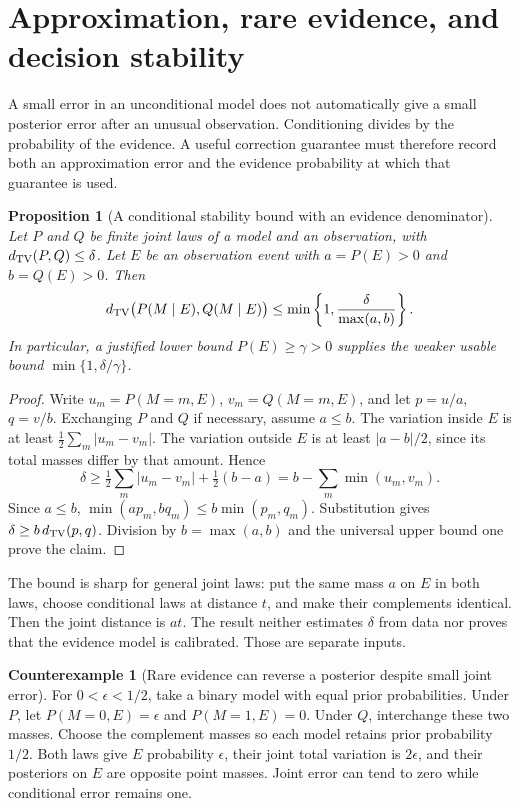 \documentclass[11pt,letterpaper]{article}
\theoremstyle{plain}
\newtheorem{proposition}[theorem]{Proposition}
\theoremstyle{definition}
\newtheorem{counterexample}[theorem]{Counterexample}
\begin{document}
\section{Approximation, rare evidence, and decision stability}\label{sec:posterior-errors}
A small error in an unconditional model does not automatically give a small posterior error after an unusual observation. Conditioning divides by the probability of the evidence. A useful correction guarantee must therefore record both an approximation error and the evidence probability at which that guarantee is used.

\begin{proposition}[A conditional stability bound with an evidence denominator]\label{prop:conditioning}
Let $P$ and $Q$ be finite joint laws of a model and an observation, with $d_{\mathrm{TV}}(P,Q)\leq\delta$. Let $E$ be an observation event with $a=P(E)>0$ and $b=Q(E)>0$. Then
\begin{equation}\label{eq:conditional-bound}
d_{\mathrm{TV}}\bigl(P(M\mid E),Q(M\mid E)\bigr)
\leq\min\left\{1,\frac{\delta}{\max(a,b)}\right\}.
\end{equation}
In particular, a justified lower bound $P(E)\geq\gamma>0$ supplies the weaker usable bound $\min\{1,\delta/\gamma\}$.
\end{proposition}
\begin{proof}
Write $u_m=P(M=m,E)$, $v_m=Q(M=m,E)$, and let $p=u/a$, $q=v/b$. Exchanging $P$ and $Q$ if necessary, assume $a\leq b$. The variation inside $E$ is at least $\tfrac12\sum_m|u_m-v_m|$. The variation outside $E$ is at least $|a-b|/2$, since its total masses differ by that amount. Hence
\[
\delta\geq \tfrac12\sum_m|u_m-v_m|+\tfrac12(b-a)
=b-\sum_m\min(u_m,v_m).
\]
Since $a\leq b$, $\min(ap_m,bq_m)\leq b\min(p_m,q_m)$. Substitution gives $\delta\geq b\,d_{\mathrm{TV}}(p,q)$. Division by $b=\max(a,b)$ and the universal upper bound one prove the claim.
\end{proof}

The bound is sharp for general joint laws: put the same mass $a$ on $E$ in both laws, choose conditional laws at distance $t$, and make their complements identical. Then the joint distance is $at$. The result neither estimates $\delta$ from data nor proves that the evidence model is calibrated. Those are separate inputs.

\begin{counterexample}[Rare evidence can reverse a posterior despite small joint error]\label{ex:rare-evidence}
For $0<\epsilon<1/2$, take a binary model with equal prior probabilities. Under $P$, let $P(M=0,E)=\epsilon$ and $P(M=1,E)=0$. Under $Q$, interchange these two masses. Choose the complement masses so each model retains prior probability $1/2$. Both laws give $E$ probability $\epsilon$, their joint total variation is $2\epsilon$, and their posteriors on $E$ are opposite point masses. Joint error can tend to zero while conditional error remains one.
\end{counterexample}
\end{document}
